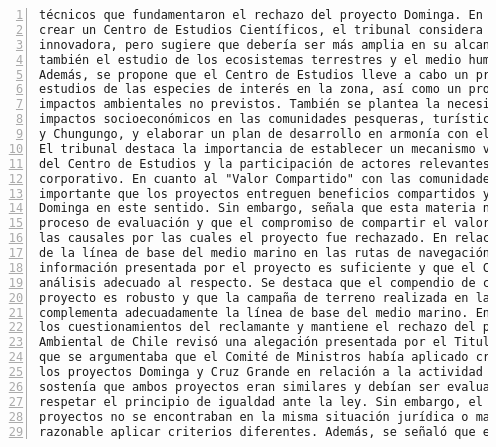 \begin{Verbatim}[frame=lines, label=Elavoración propia -  Ejemplo de Contexto enviado por el Chatbot a OpenAI
				, fontsize=\scriptsize, numbers=left
				, baselinestretch=0.4
				, formatcom=\color{gray}]
técnicos que fundamentaron el rechazo del proyecto Dominga. En cuanto a la medida propuesta de
crear un Centro de Estudios Científicos, el tribunal considera que es interesante e
innovadora, pero sugiere que debería ser más amplia en su alcance y concepción, abarcando
también el estudio de los ecosistemas terrestres y el medio humano en la comuna de La Higuera.
Además, se propone que el Centro de Estudios lleve a cabo un programa de investigación y
estudios de las especies de interés en la zona, así como un protocolo de acción frente a
impactos ambientales no previstos. También se plantea la necesidad de medir los posibles
impactos socioeconómicos en las comunidades pesqueras, turísticas y productivas de Los Choros
y Chungungo, y elaborar un plan de desarrollo en armonía con el plan de desarrollo regional.
El tribunal destaca la importancia de establecer un mecanismo vinculante para las decisiones
del Centro de Estudios y la participación de actores relevantes en su diseño y gobierno
corporativo. En cuanto al "Valor Compartido" con las comunidades, el tribunal considera que es
importante que los proyectos entreguen beneficios compartidos y reconoce la propuesta de
Dominga en este sentido. Sin embargo, señala que esta materia no se encuentra discutida en el
proceso de evaluación y que el compromiso de compartir el valor del negocio no puede sobreseer
las causales por las cuales el proyecto fue rechazado. En relación a la supuesta insuficiencia
de la línea de base del medio marino en las rutas de navegación, el tribunal considera que la
información presentada por el proyecto es suficiente y que el Comité de Ministros no hizo un
análisis adecuado al respecto. Se destaca que el compendio de conocimiento entregado por el
proyecto es robusto y que la campaña de terreno realizada en las rutas de navegación
complementa adecuadamente la línea de base del medio marino. En conclusión, el tribunal acoge
los cuestionamientos del reclamante y mantiene el rechazo del proyecto Dominga.\nEl Tribunal
Ambiental de Chile revisó una alegación presentada por el Titular del proyecto Dominga, en la
que se argumentaba que el Comité de Ministros había aplicado criterios diferentes al evaluar
los proyectos Dominga y Cruz Grande en relación a la actividad de navegación. El Titular
sostenía que ambos proyectos eran similares y debían ser evaluados de manera análoga para
respetar el principio de igualdad ante la ley. Sin embargo, el Tribunal determinó que los
proyectos no se encontraban en la misma situación jurídica o material, por lo que era
razonable aplicar criterios diferentes. Además, se señaló que el proyecto Dominga no había

\end{Verbatim}
